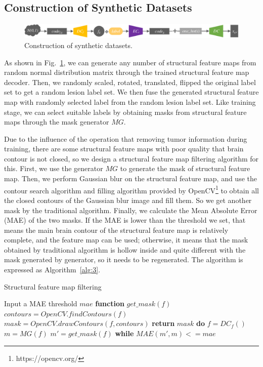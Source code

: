 \documentclass[letterpaper]{article} %
\begin{document}
\subsection{Construction of Synthetic Datasets}
\label{make dataset}
\begin{figure}
	\centering
	\includegraphics[width=0.98\columnwidth]{figures/make_data}
	\caption{Construction of synthetic datasets.}
	\label{make_data}
\end{figure}
As shown in Fig.~\ref{make_data}, we can generate any number of structural feature maps from random normal distribution matrix through the trained structural feature map decoder. Then, we randomly scaled, rotated, translated, flipped the original label set to get a random lesion label set. We then fuse the generated structural feature map with randomly selected label from the random lesion label set. Like training stage, we can select suitable labels by obtaining masks from structural feature maps through the mask generator $MG$.

Due to the influence of the operation that removing tumor information during training, there are some structural feature maps with poor quality that brain contour is not closed, so we design a structural feature map filtering algorithm for this. First, we use the generator $MG$ to generate the mask of structural feature map. Then, we perform Gaussian blur\cite{92wink2004denoising} on the structural feature map, and use the contour search algorithm and filling algorithm provided by OpenCV\footnote{https://opencv.org/} to obtain all the closed contours of the Gaussian blur image and fill them. So we get another mask by the traditional algorithm. Finally, we calculate the Mean Absolute Error (MAE) of the two masks. If the MAE is lower than the threshold we set, that means the main brain contour of the structural feature map is relatively complete, and the feature map can be used; otherwise, it means that the mask obtained by traditional algorithm is hollow inside and quite different with the mask generated by generator, so it needs to be regenerated. The algorithm is expressed as Algorithm~\ref{alg:3}.
\begin{algorithm}
	\caption{Structural feature map filtering}
	\label{alg:3}
	\begin{algorithmic}[1]
		\State Input a MAE threshold $mae$
		\State \textbf{function} $get\_mask(f)$
		\State \indent$contours = OpenCV.findContours(f)$
		\State \indent$mask =OpenCV.drawContours(f,contours)$
		\State \indent\textbf{return} $mask$
		\State \textbf{do} 
		\State \indent$f = DC_f()$
		\State \indent$m = MG(f)$
		\State \indent$m'= get\_mask(f)$
		\State \textbf{while} $MAE(m',m) <= mae$
	\end{algorithmic}  
\end{algorithm}
\end{document}
